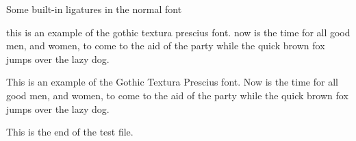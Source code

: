 \documentclass{article}
\newcommand{\sentence}{%
this is an example of the gothic textura prescius font. now is the time for all good
men, and women, to come to the aid of the party while the quick brown fox
jumps over the lazy dog.}
\newcommand{\Sentence}{%
This is an example of the Gothic Textura Prescius font. Now is the time for all good
men, and women, to come to the aid of the party while the quick brown fox
jumps over the lazy dog.}
\newcommand{\esses}{sa sb sc sd se sf sg sh si sj sk sl sm 
                    sn so sp sq sr ss st su sv sw sx sy sz}
\newcommand{\exes}{xa xb xc xd xe xf xg xh xi xj xk xl xm 
                  xn xo xp xq xr xs xt xu xv xw xx xy xz}
\newcommand{\jays}{aj bj cj dj ej fj gj hj ij jj kj lj mj 
                   nj oj pj qj rj sj tj uj vj wj xj yj zj}
\newcommand{\dees}{ad bd cd dd ed fd gd hd id jd kd ld md 
                   nd od pd qd rd sd td ud vd wd xd yd zd}
\newcommand{\ares}{ra rb rc rd re rf rg rh ri rj rk rl rm 
                   rn ro rp rq rr rs rt ru rv rw rx ry rz}
\newcommand{\Esses}{SA SB SC SD SE SF SG SH SI SJ SK SL SM 
                    SN SO SP SQ SR SS ST SU SV SW SX SY SZ}
\newcommand{\Exes}{XA XB XC XD XE XF XG XH XI XJ XK XL XM 
                  XN XO XP XQ XR XS XT XU XV XW XX XY XZ}
\newcommand{\Jays}{AJ BJ CJ DJ EJ FJ GJ HJ IJ JJ KJ LJ MJ 
                   NJ OJ PJ QJ RJ SJ TJ UJ VJ WJ XJ YJ ZJ}
\newcommand{\Dees}{AD BD CD DD ED FD GD HD ID JD KD LD MD 
                   ND OD PD QD RD SD TD UD VD WD XD YD ZD}
\newcommand{\Ares}{RA RB RC RD RE RF RG RH RI RJ RK RL RM 
                   RN RO RP RQ RR RS RT RU RV RW RX RY RZ}
\begin{document}
\begin{center}
    Some built-in ligatures in the normal font \\
\end{center}


{
\pgothfamily 
\sentence{}

\Sentence{}
}
    
    This is the end of the test file.
\end{document}
